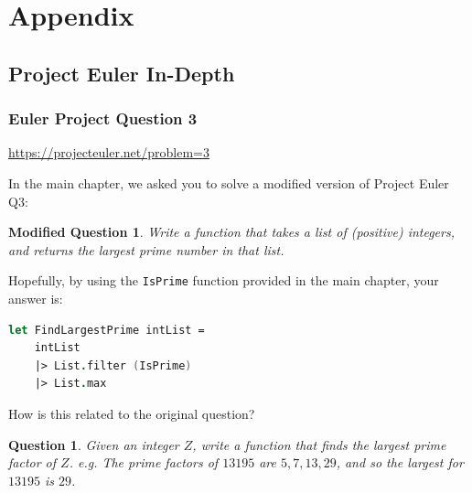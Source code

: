 \documentclass[12pt]{article}
\newtheorem*{question*}{Question}
\newtheorem*{modQuestion*}{Modified Question}
\begin{document}
\pagebreak

\appendix
\section{Appendix}


\subsection{Project Euler In-Depth}

\subsubsection{Euler Project Question 3}

\url{https://projecteuler.net/problem=3}

In the main chapter, we asked you to solve a modified version of Project Euler Q3:
\begin{modQuestion*}
Write a function that takes a list of (positive) integers, and returns the largest prime number in that list.
\end{modQuestion*}
Hopefully, by using the \texttt{IsPrime} function provided in the main chapter, your answer is:
\begin{lstlisting}[language=FSharp]
let FindLargestPrime intList =
    intList
    |> List.filter (IsPrime)
    |> List.max
\end{lstlisting}

How is this related to the original question?
\begin{question*}
Given an integer $Z$, write a function that finds the largest prime factor of $Z$. e.g. The prime factors of $13195$ are $5, 7, 13, 29$, and so the largest for $13195$ is $29$.
\end{question*}
\end{document}
